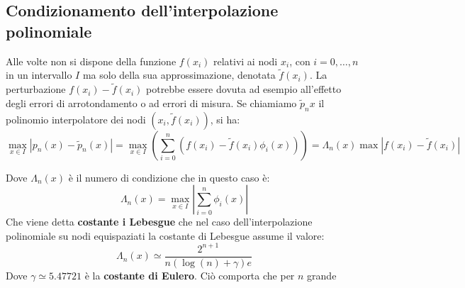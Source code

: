 \subsection{Condizionamento dell’interpolazione polinomiale}

Alle volte non si dispone della funzione $f(x_i)$ relativi ai nodi $x_i$, con $i=0,\dots, n$ in un intervallo $I$ ma solo della sua approssimazione, denotata $\tilde{f}(x_i)$. La  perturbazione $f(x_i) - \tilde{f}(x_i)$ potrebbe essere dovuta ad esempio all'effetto degli errori di arrotondamento o ad errori di misura. Se chiamiamo $\tilde{p}_n{x}$ il polinomio interpolatore dei nodi $(x_i, \tilde{f}(x_i))$, si ha:
\[
    \max_{x\in I} |p_n(x) - \tilde{p}_n(x)| = \max_{x\in I}(\sum^n_{i=0}(f(x_i)-\tilde{f}(x_i)\phi_i(x))) =  \Lambda_n (x) \max |f(x_i) - \tilde{f}(x_i)|
\]

Dove $\Lambda_n (x)$ è il numero di condizione che in questo caso è:
\[
    \Lambda_n (x) = \max_{x\in I} |\sum_{i=0}^{n}\phi_i(x)|
\]
Che viene detta \textbf{costante i Lebesgue} che nel caso dell’interpolazione polinomiale su nodi equispaziati la costante di Lebesgue assume il valore:
\[
    \Lambda_n(x) \simeq \frac{2^{n+1}}{n(\log(n) + \gamma) e}    
\]
Dove $\gamma \simeq 5.47721$ è la \textbf{costante di Eulero}. Ciò comporta che per $n$ grande 

